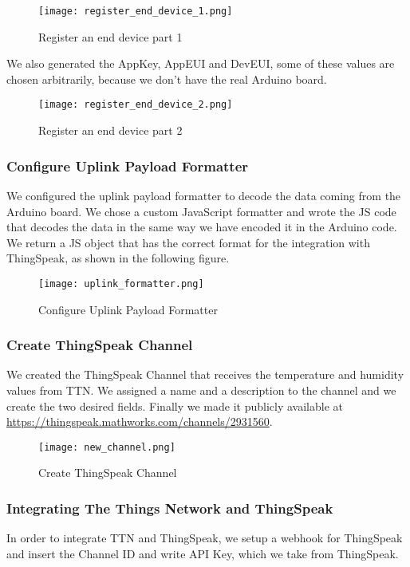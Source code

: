 \begin{figure}[H]
    \centering
    \texttt{[image: register\_end\_device\_1.png]}
    \caption{Register an end device part 1}
\end{figure}

We also generated the AppKey, AppEUI and DevEUI, some of these values are chosen arbitrarily, because we don't have the real Arduino board.

\begin{figure}[H]
    \centering
    \texttt{[image: register\_end\_device\_2.png]}
    \caption{Register an end device part 2}
\end{figure}

\subsubsection{Configure Uplink Payload Formatter}
We configured the uplink payload formatter to decode the data coming from the Arduino board. We chose a custom JavaScript formatter and wrote the JS code that decodes the data in the same way we have encoded it in the Arduino code. We return a JS object that has the correct format for the integration with ThingSpeak, as shown in the following figure.

\begin{figure}[H]
    \centering
    \texttt{[image: uplink\_formatter.png]}
    \caption{Configure Uplink Payload Formatter}
\end{figure}

\subsubsection{Create ThingSpeak Channel}
We created the ThingSpeak Channel that receives the temperature and humidity values from TTN. We assigned a name and a description to the channel and we create the two desired fields. Finally we made it publicly available at \url{https://thingspeak.mathworks.com/channels/2931560}.

\begin{figure}[H]
    \centering
    \texttt{[image: new\_channel.png]}
    \caption{Create ThingSpeak Channel}
\end{figure}

\subsubsection{Integrating The Things Network and ThingSpeak}
In order to integrate TTN and ThingSpeak, we setup a webhook for ThingSpeak and insert the Channel ID and write API Key, which we take from ThingSpeak.

